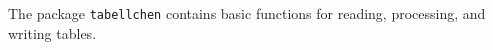 The package \texttt{tabellchen} contains basic functions for reading,
processing, and writing tables.
